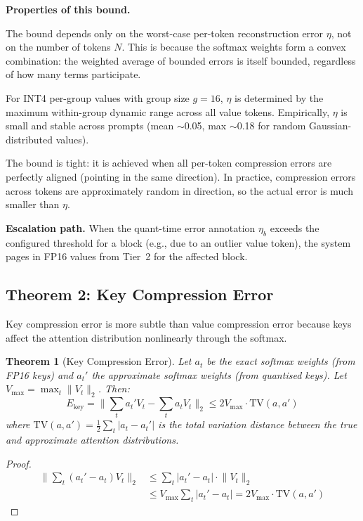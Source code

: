 \documentclass[11pt,a4paper]{article}
\newtheorem{theorem}{Theorem}[section]
\theoremstyle{definition}
\theoremstyle{remark}
\newcommand{\norm}[1]{\lVert #1 \rVert}
\begin{document}
\textbf{Properties of this bound.}

The bound depends only on the worst-case per-token reconstruction error $\eta$, not on the number of tokens $N$.  This is because the softmax weights form a convex combination: the weighted average of bounded errors is itself bounded, regardless of how many terms participate.

For INT4 per-group values with group size $g{=}16$, $\eta$ is determined by the maximum within-group dynamic range across all value tokens.  Empirically, $\eta$ is small and stable across prompts (mean $\sim$0.05, max $\sim$0.18 for random Gaussian-distributed values).

The bound is tight: it is achieved when all per-token compression errors are perfectly aligned (pointing in the same direction).  In practice, compression errors across tokens are approximately random in direction, so the actual error is much smaller than $\eta$.

\textbf{Escalation path.}  When the quant-time error annotation $\eta_b$ exceeds the configured threshold for a block (e.g., due to an outlier value token), the system pages in FP16 values from Tier~2 for the affected block.

\subsection{Theorem 2: Key Compression Error}
\label{sec:key_error}

Key compression error is more subtle than value compression error because keys affect the attention distribution nonlinearly through the softmax.

\begin{theorem}[Key Compression Error]
\label{thm:key}
Let $a_t$ be the exact softmax weights (from FP16 keys) and $a_t'$ the approximate softmax weights (from quantised keys).  Let $V_{\max} = \max_t \norm{V_t}_2$.  Then:
\begin{equation}
  E_{\mathrm{key}} = \norm{\sum_t a_t' V_t - \sum_t a_t V_t}_2 \leq 2 V_{\max} \cdot \mathrm{TV}(a, a')
\end{equation}
where $\mathrm{TV}(a, a') = \frac{1}{2}\sum_t |a_t - a_t'|$ is the total variation distance between the true and approximate attention distributions.
\end{theorem}

\begin{proof}
\begin{align*}
  \norm{\sum_t (a_t' - a_t) V_t}_2 &\leq \sum_t |a_t' - a_t| \cdot \norm{V_t}_2 \\
  &\leq V_{\max} \sum_t |a_t' - a_t| = 2 V_{\max} \cdot \mathrm{TV}(a, a')
\end{align*}
\end{proof}
\end{document}
